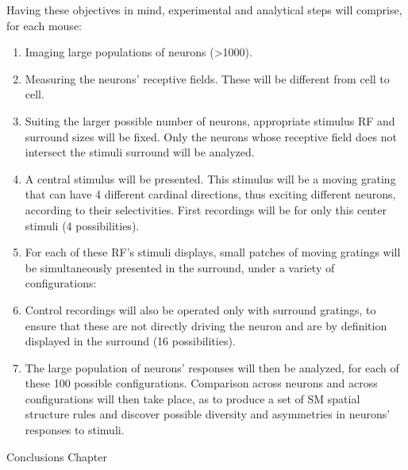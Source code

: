 Having these objectives in mind, experimental and analytical steps will comprise, for each mouse: 
\begin{enumerate}
    \item Imaging large populations of neurons (>1000).
    \item Measuring the neurons' receptive fields. These will be different from cell to cell. 
    \item Suiting the larger possible number of neurons, appropriate stimulus RF and surround sizes will be fixed. Only the neurons whose receptive field does not intersect the stimuli surround will be analyzed.
    \item A central stimulus will be presented. This stimulus will be a moving grating that can have 4 different cardinal directions, thus exciting different neurons, according to their selectivities. First recordings will be for only this center stimuli (4 possibilities).
    
    \item For each of these RF's stimuli displays, small patches of moving gratings will be simultaneously presented in the surround, under a variety of configurations:
    
        
    
    \item Control recordings will also be operated only with surround gratings, to ensure that these are not directly driving the neuron and are by definition displayed in the surround (16 possibilities).
        
    \item The large population of neurons' responses will then be analyzed, for each of these 100 possible configurations. Comparison across neurons and across configurations will then take place, as to produce a set of SM spatial structure rules and discover possible diversity and asymmetries in neurons' responses to stimuli. 
    

\end{enumerate}

Conclusions Chapter

\cleardoublepage